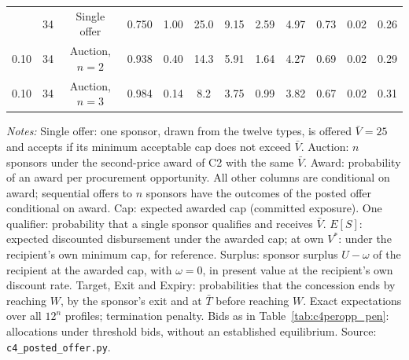 \begin{table}[htbp]
{\begin{tabular}{cccccccccccc}
\addlinespace
0.10 & 34 & Single offer & 0.750 & 1.00 & 25.0 & 9.15 & 2.59 & 4.97 & 0.73 & 0.02 & 0.26\\
0.10 & 34 & Auction, $n = 2$ & 0.938 & 0.40 & 14.3 & 5.91 & 1.64 & 4.27 & 0.69 & 0.02 & 0.29\\
0.10 & 34 & Auction, $n = 3$ & 0.984 & 0.14 & 8.2 & 3.75 & 0.99 & 3.82 & 0.67 & 0.02 & 0.31\\
\bottomrule\end{tabular}}
\par\smallskip\begin{minipage}{\textwidth}\footnotesize\textit{Notes:} Single offer: one sponsor, drawn from the twelve types, is offered $\bar V = 25$ and accepts if its minimum acceptable cap does not exceed $\bar V$. Auction: $n$ sponsors under the second-price award of C2 with the same $\bar V$. Award: probability of an award per procurement opportunity. All other columns are conditional on award; sequential offers to $n$ sponsors have the outcomes of the posted offer conditional on award. Cap: expected awarded cap (committed exposure). One qualifier: probability that a single sponsor qualifies and receives $\bar V$. $E[S]$: expected discounted disbursement under the awarded cap; at own $V^*$: under the recipient's own minimum cap, for reference. Surplus: sponsor surplus $U - \omega$ of the recipient at the awarded cap, with $\omega = 0$, in present value at the recipient's own discount rate. Target, Exit and Expiry: probabilities that the concession ends by reaching $W$, by the sponsor's exit and at $\bar T$ before reaching $W$. Exact expectations over all $12^n$ profiles; termination penalty. Bids as in Table~\ref{tab:c4peropp_pen}: allocations under threshold bids, without an established equilibrium. Source: \texttt{c4\_posted\_offer.py}.\end{minipage}
\end{table}

